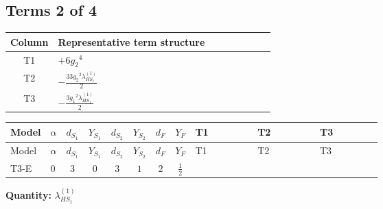 \documentclass[8pt]{article}
\begin{document}
\begin{landscape}
\subsection*{Terms 2 of 4}
\begin{center}
\begin{tabular}{@{}c >{\raggedright\arraybackslash}p{0.82\linewidth}@{}}
\toprule
Column & Representative term structure \\
\midrule
T1 & \(\displaystyle +6 {g_2}^4\) \\
\midrule
T2 & \(\displaystyle -\frac{33 {g_2}^2 {\lambda_{HS_1}^{(1)}}}{2}\) \\
\midrule
T3 & \(\displaystyle -\frac{3 {g_1}^2 {\lambda_{HS_1}^{(1)}}}{2}\) \\
\midrule
\bottomrule
\end{tabular}
\end{center}
\smallskip
\tiny
\begin{longtable}{@{}llcccccc >{\raggedright\arraybackslash}p{0.21\linewidth} >{\raggedright\arraybackslash}p{0.21\linewidth} >{\raggedright\arraybackslash}p{0.21\linewidth}@{}}
\toprule
Model & $\alpha$ & $d_{S_1}$ & $Y_{S_1}$ & $d_{S_2}$ & $Y_{S_2}$ & $d_F$ & $Y_F$ & T1 & T2 & T3 \\
\midrule
\endfirsthead
\toprule
Model & $\alpha$ & $d_{S_1}$ & $Y_{S_1}$ & $d_{S_2}$ & $Y_{S_2}$ & $d_F$ & $Y_F$ & T1 & T2 & T3 \\
\midrule
\endhead
T3-E & $0$ & $3$ & $0$ & $3$ & $1$ & $2$ & $\frac{1}{2}$ & \scriptsize\adjustbox{max width=\linewidth}{$\begin{gathered} +6 {g_2}^4\end{gathered}$} & \scriptsize\adjustbox{max width=\linewidth}{$\begin{gathered} -\frac{33 {g_2}^2 {\lambda_{HS_1}^{(1)}}}{2}\end{gathered}$} & \scriptsize\adjustbox{max width=\linewidth}{$\begin{gathered} -\frac{3 {g_1}^2 {\lambda_{HS_1}^{(1)}}}{2}\end{gathered}$} \\
\midrule
\bottomrule
\end{longtable}
\clearpage
\noindent\textbf{Quantity: }$\lambda_{HS_1}^{(1)}$\par\smallskip

\end{landscape}
\end{document}
